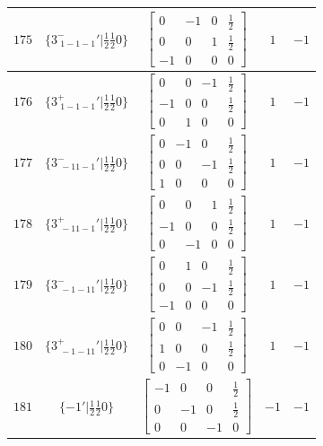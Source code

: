 \documentclass[fleqn,8pt]{jsarticle}
\begin{document}
\begin{longtable}{ccccc}
$ 175 $ & $ \{3^{-}_{\,\,1-1-1}{}'|\frac{1}{2} \frac{1}{2} 0\} $ & $ \begin{bmatrix} 0 & -1 & 0 & \frac{1}{2} \\ 0 & 0 & 1 & \frac{1}{2} \\ -1 & 0 & 0 & 0 \end{bmatrix} $ & $ 1 $ & $ -1 $ \\ \hline
$ 176 $ & $ \{3^{+}_{\,\,1-1-1}{}'|\frac{1}{2} \frac{1}{2} 0\} $ & $ \begin{bmatrix} 0 & 0 & -1 & \frac{1}{2} \\ -1 & 0 & 0 & \frac{1}{2} \\ 0 & 1 & 0 & 0 \end{bmatrix} $ & $ 1 $ & $ -1 $ \\ \hline
$ 177 $ & $ \{3^{-}_{\,\,-11-1}{}'|\frac{1}{2} \frac{1}{2} 0\} $ & $ \begin{bmatrix} 0 & -1 & 0 & \frac{1}{2} \\ 0 & 0 & -1 & \frac{1}{2} \\ 1 & 0 & 0 & 0 \end{bmatrix} $ & $ 1 $ & $ -1 $ \\ \hline
$ 178 $ & $ \{3^{+}_{\,\,-11-1}{}'|\frac{1}{2} \frac{1}{2} 0\} $ & $ \begin{bmatrix} 0 & 0 & 1 & \frac{1}{2} \\ -1 & 0 & 0 & \frac{1}{2} \\ 0 & -1 & 0 & 0 \end{bmatrix} $ & $ 1 $ & $ -1 $ \\ \hline
$ 179 $ & $ \{3^{-}_{\,\,-1-11}{}'|\frac{1}{2} \frac{1}{2} 0\} $ & $ \begin{bmatrix} 0 & 1 & 0 & \frac{1}{2} \\ 0 & 0 & -1 & \frac{1}{2} \\ -1 & 0 & 0 & 0 \end{bmatrix} $ & $ 1 $ & $ -1 $ \\ \hline
$ 180 $ & $ \{3^{+}_{\,\,-1-11}{}'|\frac{1}{2} \frac{1}{2} 0\} $ & $ \begin{bmatrix} 0 & 0 & -1 & \frac{1}{2} \\ 1 & 0 & 0 & \frac{1}{2} \\ 0 & -1 & 0 & 0 \end{bmatrix} $ & $ 1 $ & $ -1 $ \\ \hline
$ 181 $ & $ \{-1{}'|\frac{1}{2} \frac{1}{2} 0\} $ & $ \begin{bmatrix} -1 & 0 & 0 & \frac{1}{2} \\ 0 & -1 & 0 & \frac{1}{2} \\ 0 & 0 & -1 & 0 \end{bmatrix} $ & $ -1 $ & $ -1 $ \\ \hline

\end{longtable}
\end{document}
